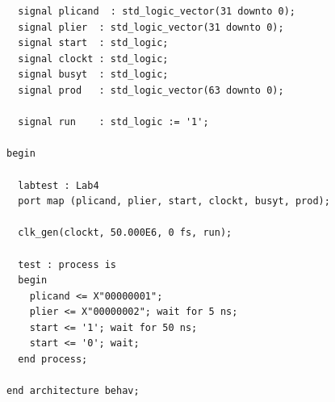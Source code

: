 \documentclass[11pt]{report}
\begin{document}
\begin{spacing}{1.5}
\begin{lstlisting}
  signal plicand  : std_logic_vector(31 downto 0);
  signal plier  : std_logic_vector(31 downto 0);
  signal start  : std_logic;
  signal clockt : std_logic;
  signal busyt  : std_logic;
  signal prod   : std_logic_vector(63 downto 0);

  signal run    : std_logic := '1';

begin

  labtest : Lab4
  port map (plicand, plier, start, clockt, busyt, prod);

  clk_gen(clockt, 50.000E6, 0 fs, run);

  test : process is
  begin
    plicand <= X"00000001";
    plier <= X"00000002"; wait for 5 ns;
    start <= '1'; wait for 50 ns;
    start <= '0'; wait;
  end process;

end architecture behav;
\end{lstlisting}


\end{spacing}
\end{document}
